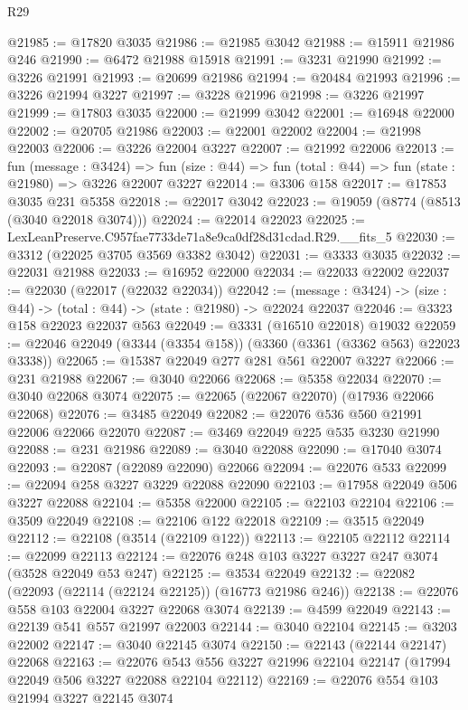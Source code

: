 \begin{lexlean}{R29}
\begin{coremodule}
@21985 := @17820 @3035
@21986 := @21985 @3042
@21988 := @15911 @21986 @246
@21990 := @6472 @21988 @15918
@21991 := @3231 @21990
@21992 := @3226 @21991
@21993 := @20699 @21986
@21994 := @20484 @21993
@21996 := @3226 @21994 @3227
@21997 := @3228 @21996
@21998 := @3226 @21997
@21999 := @17803 @3035
@22000 := @21999 @3042
@22001 := @16948 @22000
@22002 := @20705 @21986
@22003 := @22001 @22002
@22004 := @21998 @22003
@22006 := @3226 @22004 @3227
@22007 := @21992 @22006
@22013 := fun (message : @3424) =>
  fun (size : @44) => fun (total : @44) => fun (state : @21980) => @3226 @22007 @3227
@22014 := @3306 @158
@22017 := @17853 @3035 @231 @5358
@22018 := @22017 @3042
@22023 := @19059 (@8774 (@8513 (@3040 @22018 @3074)))
@22024 := @22014 @22023
@22025 := LexLeanPreserve.C957fae7733de71a8e9ca0df28d31cdad.R29.__fits_5
@22030 := @3312 (@22025 @3705 @3569 @3382 @3042)
@22031 := @3333 @3035
@22032 := @22031 @21988
@22033 := @16952 @22000
@22034 := @22033 @22002
@22037 := @22030 (@22017 (@22032 @22034))
@22042 := (message : @3424) -> (size : @44) -> (total : @44) -> (state : @21980) -> @22024 @22037
@22046 := @3323 @158 @22023 @22037 @563
@22049 := @3331 (@16510 @22018) @19032
@22059 := @22046 @22049 (@3344 (@3354 @158)) (@3360 (@3361 (@3362 @563) @22023 @3338))
@22065 := @15387 @22049 @277 @281 @561 @22007 @3227
@22066 := @231 @21988
@22067 := @3040 @22066
@22068 := @5358 @22034
@22070 := @3040 @22068 @3074
@22075 := @22065 (@22067 @22070) (@17936 @22066 @22068)
@22076 := @3485 @22049
@22082 := @22076 @536 @560 @21991 @22006 @22066 @22070
@22087 := @3469 @22049 @225 @535 @3230 @21990
@22088 := @231 @21986
@22089 := @3040 @22088
@22090 := @17040 @3074
@22093 := @22087 (@22089 @22090) @22066
@22094 := @22076 @533
@22099 := @22094 @258 @3227 @3229 @22088 @22090
@22103 := @17958 @22049 @506 @3227 @22088
@22104 := @5358 @22000
@22105 := @22103 @22104
@22106 := @3509 @22049
@22108 := @22106 @122 @22018
@22109 := @3515 @22049
@22112 := @22108 (@3514 (@22109 @122))
@22113 := @22105 @22112
@22114 := @22099 @22113
@22124 := @22076 @248 @103 @3227 @3227 @247 @3074 (@3528 @22049 @53 @247)
@22125 := @3534 @22049
@22132 := @22082 (@22093 (@22114 (@22124 @22125)) (@16773 @21986 @246))
@22138 := @22076 @558 @103 @22004 @3227 @22068 @3074
@22139 := @4599 @22049
@22143 := @22139 @541 @557 @21997 @22003
@22144 := @3040 @22104
@22145 := @3203 @22002
@22147 := @3040 @22145 @3074
@22150 := @22143 (@22144 @22147) @22068
@22163 := @22076
    @543
    @556
    @3227
    @21996
    @22104
    @22147
    (@17994 @22049 @506 @3227 @22088 @22104 @22112)
@22169 := @22076 @554 @103 @21994 @3227 @22145 @3074

\end{coremodule}
\end{lexlean}
